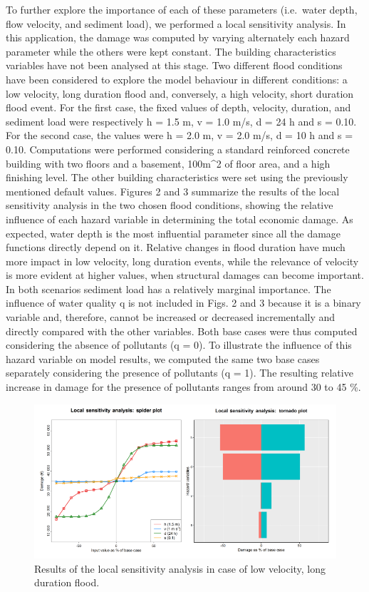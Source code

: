 \documentclass[gc, manuscript]{copernicus}
\begin{document}
To further explore the importance of each of these parameters
(i.e.~water depth, flow velocity, and sediment load), we performed a
local sensitivity analysis. In this application, the damage was computed
by varying alternately each hazard parameter while the others were kept
constant. The building characteristics variables have not been analysed
at this stage. Two different flood conditions have been considered to
explore the model behaviour in different conditions: a low velocity,
long duration flood and, conversely, a high velocity, short duration
flood event. For the first case, the fixed values of depth, velocity,
duration, and sediment load were respectively h = 1.5 m, v = 1.0 m/s, d
= 24 h and s = 0.10. For the second case, the values were h = 2.0 m, v =
2.0 m/s, d = 10 h and s = 0.10. Computations were performed considering
a standard reinforced concrete building with two floors and a basement,
100m\^{}2 of floor area, and a high finishing level. The other building
characteristics were set using the previously mentioned default values.
Figures 2 and 3 summarize the results of the local sensitivity analysis
in the two chosen flood conditions, showing the relative influence of
each hazard variable in determining the total economic damage. As
expected, water depth is the most influential parameter since all the
damage functions directly depend on it. Relative changes in flood
duration have much more impact in low velocity, long duration events,
while the relevance of velocity is more evident at higher values, when
structural damages can become important. In both scenarios sediment load
has a relatively marginal importance. The influence of water quality q
is not included in Figs. 2 and 3 because it is a binary variable and,
therefore, cannot be increased or decreased incrementally and directly
compared with the other variables. Both base cases were thus computed
considering the absence of pollutants (q = 0). To illustrate the
influence of this hazard variable on model results, we computed the same
two base cases separately considering the presence of pollutants (q =
1). The resulting relative increase in damage for the presence of
pollutants ranges from around 30 to 45 \%.

\begin{figure}
\includegraphics[width=13cm]{fig2} \caption{Results of the local sensitivity analysis in case of low velocity, long duration flood.}\label{fig:unnamed-chunk-3}
\end{figure}
\end{document}
